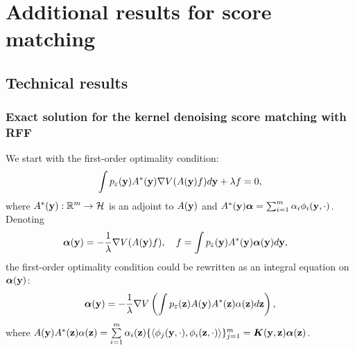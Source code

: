 \chapter{Additional results for score matching}

\section{Technical results}
\label{chap:Technical}

\subsection{Exact solution for the kernel denoising score matching with RFF}
\label{sec:exact_solution}
We start with the first-order optimality condition:
\begin{equation*}
    \int p_{\varepsilon}({\bf y}) A^*({\bf y})\nabla V(A({\bf y})f)d{\bf y} + \lambda f = 0,
\end{equation*}
where $A^*({\bf y}): \mathbb{R}^m \to \mathcal{H}$ is an adjoint to $A({\bf y})$ and
$A^*({\bf y}){\bm \alpha} = \sum_{i = 1}^m \alpha_i\phi_i({\bf y}, \cdot)$.
Denoting
\begin{align*}
    &{\bm \alpha}({\bf y}) = -\frac{1}{\lambda}\nabla V(A({\bf y})f),\quad f = \int p_{\varepsilon}({\bf y})A^*({\bf y}){\bm \alpha}({\bf y})d {\bf y},
\end{align*}
the first-order optimality condition could be rewritten as an integral equation on
${\bm \alpha}({\bf y})$:
\begin{equation}
    {\bm \alpha}({\bf y}) = -\frac{1}{\lambda}\nabla V\left(\int p_{\varepsilon}({\bf z})A({\bf y})A^*({\bf z})\alpha({\bf z})d{\bf z}\right),
\end{equation}
where $A({\bf y})A^*({\bf z})\alpha({\bf z}) = \sum\limits_{i = 1}^m\alpha_i({\bf z})\{\langle \phi_j({\bf y}, \cdot),  \phi_i({\bf z}, \cdot)\rangle\}_{j = 1}^m = {\bm K}({\bf y}, {\bf z}){\bm \alpha}({\bf z})$.

